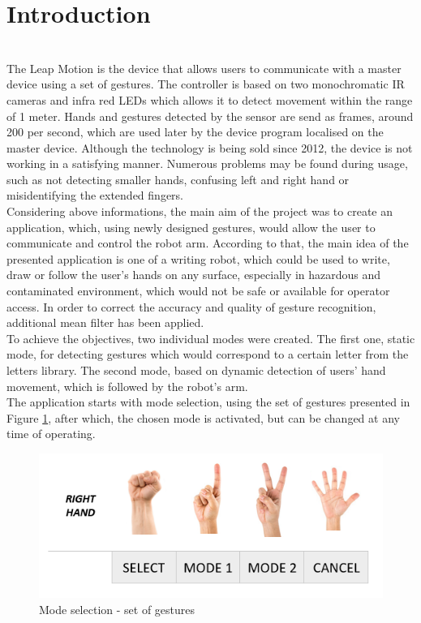 \section{Introduction}

\mbox{}\\

The Leap Motion is the device that allows users to communicate with a master device using a set of gestures. The controller is based on two monochromatic IR cameras and infra red LEDs which allows it to detect movement within the range of 1 meter. Hands and gestures detected by the sensor are send as frames, around 200 per second, which are used later by the device program localised on the master device. Although the technology is being sold since 2012, the device is not working in a satisfying manner. Numerous problems may be found during usage, such as not detecting smaller hands, confusing left and right hand or misidentifying the extended fingers. \\

Considering above informations, the main aim of the project was to create an application, which, using newly designed gestures, would allow the user to communicate and control the robot arm. According to that, the main idea of the presented application is one of a writing robot, which could be used to write, draw or follow the user's hands on any surface, especially in hazardous and contaminated environment, which would not be safe or available for operator access. In order to correct the accuracy and quality of gesture recognition, additional mean filter has been applied.\\

To achieve the objectives, two individual modes were created. The first one, static mode, for detecting gestures which would correspond to a certain letter from the letters library. The second mode, based on dynamic detection of users' hand movement, which is followed by the robot's arm. \\

The application starts with mode selection, using the set of gestures presented in Figure \ref{fig:mode}, after which, the chosen mode is activated, but can be changed at any time of operating. 


\begin{figure}[H]
	\includegraphics{mode_selection}
	\centering
	\caption{Mode selection - set of gestures}
	\label{fig:mode}
\end{figure}


